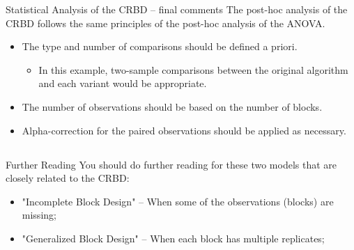 \begin{frame}{Statistical Analysis of the CRBD -- final comments}
  The post-hoc analysis of the CRBD follows the same principles of the
  post-hoc analysis of the ANOVA.\bigskip

  \begin{itemize}
    \item The type and number of comparisons should be defined a priori.
    \begin{itemize}
      \item In this example, two-sample comparisons between the original algorithm and each variant would be appropriate.
    \end{itemize}
    \item The number of observations should be based on the number of blocks.
    \item Alpha-correction for the paired observations should be applied as necessary.
  \end{itemize}
\end{frame}

\subsection{}
\begin{frame}{Further Reading}
  You should do further reading for these two models that are closely related to the CRBD:
  \begin{itemize}
    \item "Incomplete Block Design" -- When some of the observations (blocks) are missing;
    \item "Generalized Block Design" -- When each block has multiple replicates;
  \end{itemize}
\end{frame}
